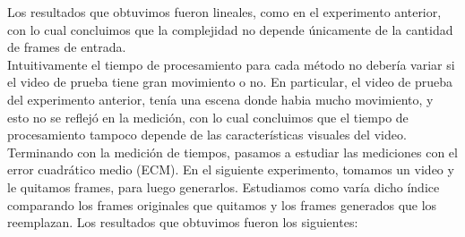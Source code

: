 Los resultados que obtuvimos fueron lineales, como en el experimento anterior, con lo cual concluimos que la complejidad no depende únicamente de la cantidad de frames de entrada. \\

Intuitivamente el tiempo de procesamiento para cada método no debería variar si el video de prueba tiene gran movimiento o no. En particular, el video de prueba del experimento anterior, tenía una escena donde habia mucho movimiento, y esto no se reflejó en la medición, con lo cual concluimos que el tiempo de procesamiento tampoco depende de las características visuales del video.\\


Terminando con la medición de tiempos, pasamos a estudiar las mediciones con el error cuadrático medio (ECM). En el siguiente experimento, tomamos un video y le quitamos frames, para luego generarlos. Estudiamos como varía dicho índice comparando los frames originales que quitamos y los frames generados que los reemplazan. Los resultados que obtuvimos fueron los siguientes:









